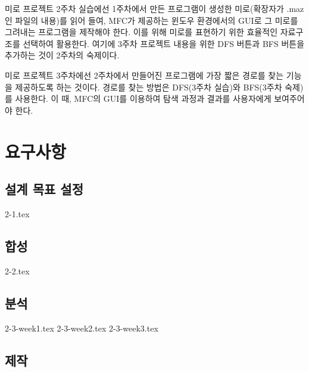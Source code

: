 미로 프로젝트 2주차 실습에선 1주차에서 만든 프로그램이 생성한 미로(확장자가 .maz인 파일의 내용)를 읽어 들여, MFC가 제공하는 윈도우 환경에서의 GUI로 그 미로를 그려내는 프로그램을
제작해야 한다. 이를 위해 미로를 표현하기 위한 효율적인 자료구조를 선택하여 활용한다. 여기에 3주차 프로젝트 내용을 위한 DFS 버튼과 BFS 버튼을 추가하는 것이 2주차의 숙제이다.

미로 프로젝트 3주차에선 2주차에서 만들어진 프로그램에 가장 짧은 경로를 찾는 기능을 제공하도록 하는 것이다. 경로를 찾는 방법은 DFS(3주차 실습)와 BFS(3주차 숙제)를 사용한다.
이 때, MFC의 GUI를 이용하여 탐색 과정과 결과를 사용자에게 보여주어야 한다.

\section{요구사항}
\subsection{설계 목표 설정}
{2-1.tex}

\subsection{합성}
{2-2.tex}

\newpage
\subsection{분석}
{2-3-week1.tex}
{2-3-week2.tex}
{2-3-week3.tex}

\subsection{제작}

